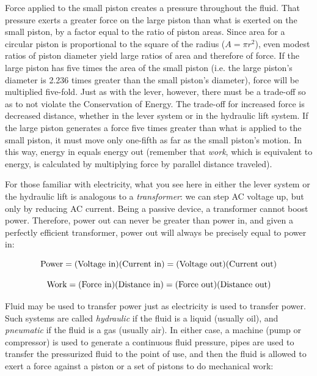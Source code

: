 Force applied to the small piston creates a pressure throughout the fluid.  That pressure exerts a greater force on the large piston than what is exerted on the small piston, by a factor equal to the ratio of piston areas.  Since area for a circular piston is proportional to the square of the radius ($A = \pi r^2$), even modest ratios of piston diameter yield large ratios of area and therefore of force.  If the large piston has five times the area of the small piston (i.e. the large piston's diameter is 2.236 times greater than the small piston's diameter), force will be multiplied five-fold.  Just as with the lever, however, there must be a trade-off so as to not violate the Conservation of Energy.  The trade-off for increased force is decreased distance, whether in the lever system or in the hydraulic lift system.  If the large piston generates a force five times greater than what is applied to the small piston, it must move only one-fifth as far as the small piston's motion.  In this way, energy in equals energy out (remember that \textit{work}, which is equivalent to energy, is calculated by multiplying force by parallel distance traveled).  

\filbreak

For those familiar with electricity, what you see here in either the lever system or the hydraulic lift is analogous to a \textit{transformer}: we can step AC voltage up, but only by reducing AC current.  Being a passive device, a transformer cannot boost power.  Therefore, power out can never be greater than power in, and given a perfectly efficient transformer, power out will always be precisely equal to power in:

$$\hbox{Power} = (\hbox{Voltage in}) (\hbox{Current in}) = (\hbox{Voltage out}) (\hbox{Current out})$$

$$\hbox{Work} = (\hbox{Force in}) (\hbox{Distance in}) = (\hbox{Force out}) (\hbox{Distance out})$$

Fluid may be used to transfer power just as electricity is used to transfer power.  Such systems are called \textit{hydraulic} if the fluid is a liquid (usually oil), and \textit{pneumatic} if the fluid is a gas (usually air).  In either case, a machine (pump or compressor) is used to generate a continuous fluid pressure, pipes are used to transfer the pressurized fluid to the point of use, and then the fluid is allowed to exert a force against a piston or a set of pistons to do mechanical work:  


